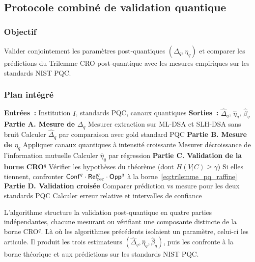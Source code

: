 \subsection{Protocole combin\'e de validation quantique}
\label{subsec:protocole_combine}
\begin{sloppypar}

\subsubsection{Objectif}
\label{subsubsec:objectif_combine}

Valider conjointement les param\`etres post-quantiques $(\Delta_q, \eta_q)$ et
comparer les pr\'edictions du Trilemme CRO post-quantique avec les mesures
empiriques sur les standards NIST PQC.

\subsubsection{Plan int\'egr\'e}
\label{subsubsec:design_combine}

\begin{algorithm}[H]
\caption{Protocole combin\'e post-quantique}
\label{alg:protocole_combine}
\begin{algorithmic}[1]
\State \textbf{Entr\'ees~:} Institution $I$, standards PQC, canaux quantiques
\State \textbf{Sorties~:} $\hat\Delta_q$, $\hat\eta_q$, $\hat\beta_q$
\State \textbf{Partie A. Mesure de $\Delta_q$}
\State Mesurer extraction sur ML-DSA et SLH-DSA sans bruit
\State Calculer $\hat\Delta_q$ par comparaison avec gold standard PQC
\State \textbf{Partie B. Mesure de $\eta_q$}
\State Appliquer canaux quantiques \`a intensit\'e croissante
\State Mesurer d\'ecroissance de l'information mutuelle
\State Calculer $\hat\eta_q$ par r\'egression
\State \textbf{Partie C. Validation de la borne CRO$^q$}
\State V\'erifier les hypoth\`eses du th\'eor\`eme (dont $H(V|C) \geq \gamma$)
\State Si elles tiennent, confronter $\mathsf{Conf}^q \cdot \mathsf{Rel}_{\mathrm{rec}}^q \cdot \mathsf{Opp}^q$ \`a la borne~\eqref{eq:trilemme_pq_raffine}
\State \textbf{Partie D. Validation crois\'ee}
\State Comparer pr\'ediction vs mesure pour les deux standards PQC
\State Calculer erreur relative et intervalles de confiance
\end{algorithmic}
\end{algorithm}

L'algorithme structure la validation post-quantique en quatre parties
ind\'ependantes, chacune mesurant ou v\'erifiant une composante distincte
de la borne CRO$^q$. L\`a o\`u les algorithmes pr\'ec\'edents isolaient
un param\`etre, celui-ci les articule. Il produit les trois estimateurs
$(\hat\Delta_q, \hat\eta_q, \hat\beta_q)$, puis les confronte \`a la
borne th\'eorique et aux pr\'edictions sur les standards NIST PQC.


\end{sloppypar}
